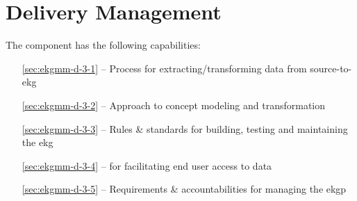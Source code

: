 \chapter{ Delivery Management}\label{ch:ekgmm-d-3}

The  component has the following capabilities:

\begin{itemize}[leftmargin=.5in]
  \item [\ref{sec:ekgmm-d-3-1}]  -- Process for extracting/transforming data from source-to-\gls{ekg}
  \item [\ref{sec:ekgmm-d-3-2}]  -- Approach to concept modeling and transformation
  \item [\ref{sec:ekgmm-d-3-3}]  -- Rules \& standards for building, testing and maintaining the \gls{ekg}
  \item [\ref{sec:ekgmm-d-3-4}]  --  for facilitating end user access to data
  \item [\ref{sec:ekgmm-d-3-5}]  -- Requirements \& accountabilities for managing the \gls{ekgp}
\end{itemize}







